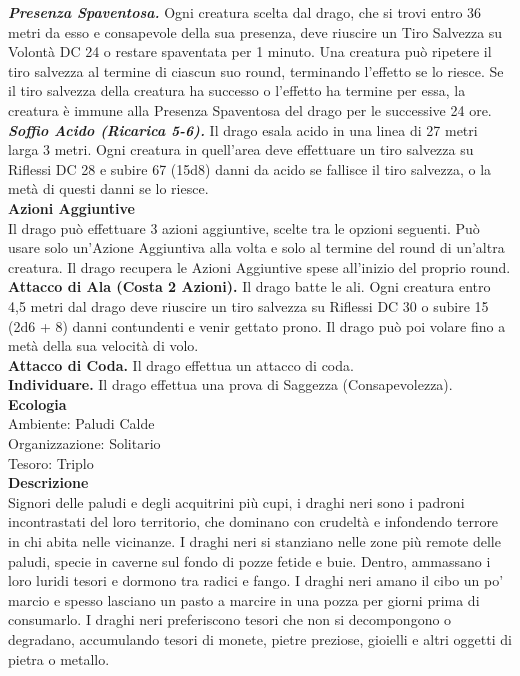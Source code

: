 \begin{multicols}{2}
\emph{\textbf{Presenza Spaventosa.}} Ogni creatura scelta dal drago, che si trovi entro 36 metri da esso e consapevole della sua presenza, deve riuscire un Tiro Salvezza su Volontà DC  24 o restare spaventata per 1 minuto. Una creatura può ripetere il tiro salvezza al termine di ciascun suo round, terminando l'effetto se lo riesce. Se il tiro salvezza della creatura ha successo o l'effetto ha termine per essa, la creatura è immune alla Presenza Spaventosa del drago per le successive 24 ore.\\
\emph{\textbf{Soffio Acido (Ricarica 5-6).}} Il drago esala acido in una linea di 27 metri larga 3 metri. Ogni creatura in quell'area deve effettuare un tiro salvezza su Riflessi DC  28 e subire 67 (15d8) danni da acido se fallisce il tiro salvezza, o la metà di questi danni se lo riesce.\\
\textbf{Azioni Aggiuntive}\\
Il drago può effettuare 3 azioni aggiuntive, scelte tra le opzioni seguenti. Può usare solo un'Azione Aggiuntiva alla volta e solo al termine del round di un'altra creatura. Il drago recupera le Azioni Aggiuntive spese all'inizio del proprio round.\\
\textbf{Attacco di Ala (Costa 2 Azioni).} Il drago batte le ali. Ogni creatura entro 4,5 metri dal drago deve riuscire un tiro salvezza su Riflessi DC  30 o subire 15 (2d6 + 8) danni contundenti e venir gettato prono. Il drago può poi volare fino a metà della sua velocità di volo.\\
\textbf{Attacco di Coda.} Il drago effettua un attacco di coda.  \\
\textbf{Individuare.} Il drago effettua una prova di Saggezza (Consapevolezza).\\
\textbf{Ecologia}\\
Ambiente: Paludi Calde\\
Organizzazione: Solitario\\
Tesoro: Triplo\\
\textbf{Descrizione}\\
Signori delle paludi e degli acquitrini più cupi, i draghi neri sono i padroni incontrastati del loro territorio, che dominano con crudeltà e infondendo terrore in chi abita nelle vicinanze. I draghi neri si stanziano nelle zone più remote delle paludi, specie in caverne sul fondo di pozze fetide e buie. Dentro, ammassano i loro luridi tesori e dormono tra radici e fango. I draghi neri amano il cibo un po’ marcio e spesso lasciano un pasto a marcire in una pozza per giorni prima di consumarlo. I draghi neri preferiscono tesori che non si decompongono o degradano, accumulando tesori di monete, pietre preziose, gioielli e altri oggetti di pietra o metallo.\\

\end{multicols}
